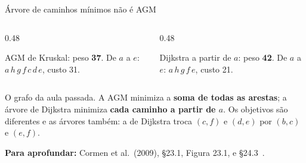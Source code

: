 \documentclass[aspectratio=169,xcolor=table]{beamer}
\newcommand{\arestasclrs}{a/b/4, a/h/8, b/c/8, b/h/11, c/d/7, c/f/4, c/i/2,
  d/e/9, d/f/14, e/f/10, f/g/2, g/h/1, g/i/6, h/i/7}
\newcommand{\grafoclrs}[2]{%
  \coordinate (a) at (0,0);     \coordinate (b) at (1,1);
  \coordinate (c) at (2.3,1);   \coordinate (d) at (3.6,1);
  \coordinate (e) at (4.6,0);   \coordinate (f) at (3.6,-1);
  \coordinate (g) at (2.3,-1);  \coordinate (h) at (1,-1);
  \coordinate (i) at (1.75,0);
  \foreach \u/\v/\w in \arestasclrs \draw[aresta] (\u) -- (\v);
  \def\lista{#1}\ifx\lista\empty\else
    \foreach \u/\v in {#1} \draw[arvore] (\u) -- (\v);\fi
  \foreach \u/\v/\w in \arestasclrs \path (\u) -- (\v) node[peso, pos=0.5] {\w};
  \foreach \v in {a,...,i} \node[vert] at (\v) {\v};
  \def\lista{#2}\ifx\lista\empty\else
    \foreach \v in {#2} \node[vdentro] at (\v) {\v};\fi
}
\newcommand{\fonte}[1]{%
  \vfill
  {\tiny\color{gray!55!black}\textbf{Para aprofundar:} #1\par}%
}
\begin{document}
\begin{frame}{Árvore de caminhos mínimos não é AGM}
  \begin{columns}[c]
    \begin{column}{0.48\textwidth}
      \begin{center}
      \end{center}
      \scriptsize\centering AGM de Kruskal: peso \textbf{37}.
      De $a$ a $e$: $a\,h\,g\,f\,c\,d\,e$, custo 31.
    \end{column}
    \begin{column}{0.48\textwidth}
      \begin{center}
      \end{center}
      \scriptsize\centering Dijkstra a partir de $a$: peso \textbf{42}.
      De $a$ a $e$: $a\,h\,g\,f\,e$, custo 21.
    \end{column}
  \end{columns}
  \medskip
  {\scriptsize O grafo da aula passada. A AGM minimiza a \textbf{soma de todas as arestas}; a
  árvore de Dijkstra minimiza \textbf{cada caminho a partir de $a$}. Os objetivos são
  diferentes e as árvores também: a de Dijkstra troca $(c,f)$ e $(d,e)$ por $(b,c)$ e
  $(e,f)$.\par}
  \fonte{Cormen et al.\ (2009), \S 23.1, Figura 23.1, e \S 24.3~\cite{cormen2009introduction}.}
\end{frame}
\end{document}
